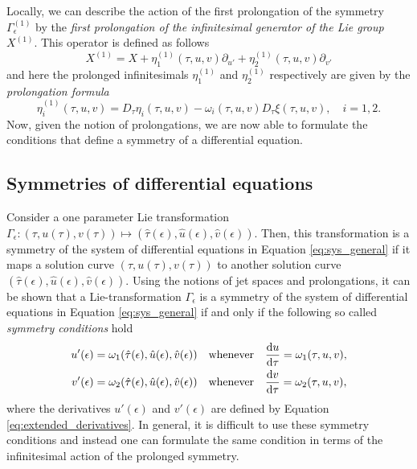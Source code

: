     Locally, we can describe the action of the first prolongation of the symmetry $\Gamma^{(1)}_{\epsilon}$ by the \textit{first prolongation of the infinitesimal generator of the Lie group} $X^{(1)}$. This operator is defined as follows
\begin{equation}
X^{(1)}=X+\eta_1^{(1)}(\tau,u,v)\partial_{u'}+\eta_2^{(1)}(\tau,u,v)\partial_{v'}
\label{eq:prolonged_generator}
\end{equation}
and here the prolonged infinitesimals $\eta_1^{(1)}$ and $\eta_{2}^{(1)}$ respectively are given by the \textit{prolongation formula}
\begin{equation}
\eta_{i}^{(1)}(\tau,u,v)=D_\tau\eta_i(\tau,u,v)-\omega_i(\tau,u,v) D_\tau\xi(\tau,u,v),\quad i=1,2.
  \label{eq:prolongation_formula}
\end{equation}
Now, given the notion of prolongations, we are now able to formulate the conditions that define a symmetry of a differential equation. 


\subsection{Symmetries of differential equations}
Consider a one parameter Lie transformation $\Gamma_\epsilon:(\tau,u(\tau),v(\tau))\mapsto(\hat{\tau}(\epsilon),\hat{u}(\epsilon),\hat{v}(\epsilon))$. Then, this transformation is a symmetry of the system of differential equations in Equation \eqref{eq:sys_general} if it maps a solution curve $(\tau,u(\tau),v(\tau))$ to another solution curve $(\hat{\tau}(\epsilon),\hat{u}(\epsilon),\hat{v}(\epsilon))$. Using the notions of jet spaces and prolongations, it can be shown that a Lie-transformation $\Gamma_\epsilon$ is a symmetry of the system of differential equations in Equation \eqref{eq:sys_general} if and only if the following so called \textit{symmetry conditions} hold
\begin{equation}
 \begin{split}
   u'(\epsilon)&=\omega_1(\hat{\tau}(\epsilon),\hat{u}(\epsilon),\hat{v}(\epsilon))\quad\mathrm{whenever}\quad\dv{u}{\tau}=\omega_1(\tau,u,v),\\
   v'(\epsilon)&=\omega_2(\hat{\tau}(\epsilon),\hat{u}(\epsilon),\hat{v}(\epsilon))\quad\mathrm{whenever}\quad\dv{v}{\tau}=\omega_2(\tau,u,v),\\   
 \end{split}
 \label{eq:sym_cond}
\end{equation}
where the derivatives $u'(\epsilon)$ and $v'(\epsilon)$ are defined by Equation \eqref{eq:extended_derivatives}. In general, it is difficult to use these symmetry conditions and instead one can formulate the same condition in terms of the infinitesimal action of the prolonged symmetry. 



